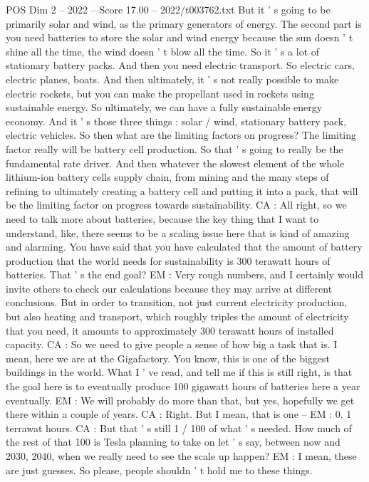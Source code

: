 \begin{textsample}{POS Dim 2 – 2022 – Score 17.00 – 2022/t003762.txt}
But it ' s going to be primarily solar and wind, as the primary generators of energy.
The second part is you need batteries to store the solar and wind energy because the sun doesn ' t shine all the time, the wind doesn ' t blow all the time.
So it ' s a lot of stationary battery packs.
And then you need electric transport.
So electric cars, electric planes, boats.
And then ultimately, it ' s not really possible to make electric rockets, but you can make the propellant used in rockets using sustainable energy.
So ultimately, we can have a fully sustainable energy economy.
And it ' s those three things : solar / wind, stationary battery pack, electric vehicles.
So then what are the limiting factors on progress?
The limiting factor really will be battery cell production.
So that ' s going to really be the fundamental rate driver.
And then whatever the slowest element of the whole lithium-ion battery cells supply chain, from mining and the many steps of refining to ultimately creating a battery cell and putting it into a pack, that will be the limiting factor on progress towards sustainability.
CA : All right, so we need to talk more about batteries, because the key thing that I want to understand, like, there seems to be a scaling issue here that is kind of amazing and alarming.
You have said that you have calculated that the amount of battery production that the world needs for sustainability is 300 terawatt hours of batteries.
That ' s the end goal?
EM : Very rough numbers, and I certainly would invite others to check our calculations because they may arrive at different conclusions.
But in order to transition, not just current electricity production, but also heating and transport, which roughly triples the amount of electricity that you need, it amounts to approximately 300 terawatt hours of installed capacity.
CA : So we need to give people a sense of how big a task that is.
I mean, here we are at the Gigafactory.
You know, this is one of the biggest buildings in the world.
What I ' ve read, and tell me if this is still right, is that the goal here is to eventually produce 100 gigawatt hours of batteries here a year eventually.
EM : We will probably do more than that, but yes, hopefully we get there within a couple of years.
CA : Right.
But I mean, that is one -- EM : 0. 1 terrawat hours.
CA : But that ' s still 1 / 100 of what ' s needed.
How much of the rest of that 100 is Tesla planning to take on let ' s say, between now and 2030, 2040, when we really need to see the scale up happen?
EM : I mean, these are just guesses.
So please, people shouldn ' t hold me to these things.

\end{textsample}
